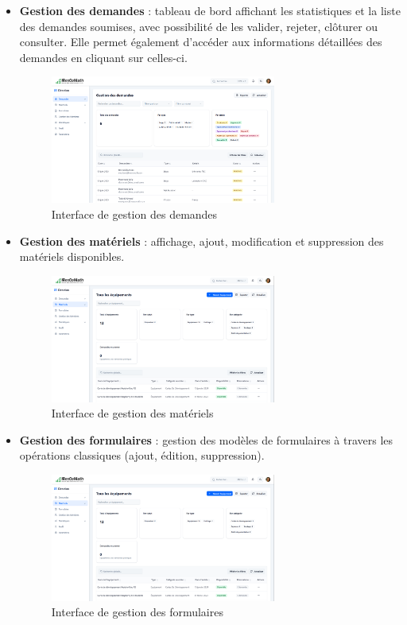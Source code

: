 \begin{itemize}
    \item \textbf{Gestion des demandes} : tableau de bord affichant les statistiques et la liste des demandes soumises, avec possibilité de les valider, rejeter, clôturer ou consulter. Elle permet également d'accéder aux informations détaillées des demandes en cliquant sur celles-ci.
    \begin{figure}[H]
        \centering
        \includegraphics[width=0.7\textwidth]{images/interface/Demandes.png}
        \caption{Interface de gestion des demandes}
        \label{fig:gestion_demandes_directeur}
    \end{figure}
    \item \textbf{Gestion des matériels} : affichage, ajout, modification et suppression des matériels disponibles.
    \begin{figure}[H]
        \centering
        \includegraphics[width=0.7\textwidth]{images/interface/materiels.png}
        \caption{Interface de gestion des matériels}
        \label{fig:gestion_materiels_directeur}
    \end{figure}

    \item \textbf{Gestion des formulaires} : gestion des modèles de formulaires à travers les opérations classiques (ajout, édition, suppression).
    \begin{figure}[H]
        \centering
        \includegraphics[width=0.7\textwidth]{images/interface/Formulaires.png}
        \caption{Interface de gestion des formulaires}
        \label{fig:gestion_formulaires_directeur}
    \end{figure}


\end{itemize}

